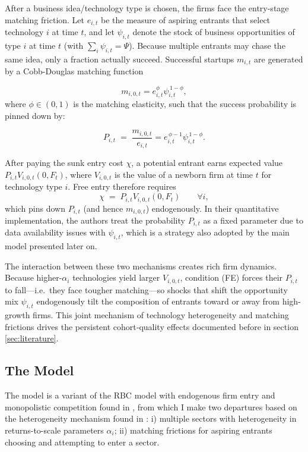 \documentclass[a4paper,12pt]{article} %
\numberwithin{equation}{section} %
\numberwithin{figure}{section}
\numberwithin{table}{section}
\begin{document}
After a business idea/technology type is chosen, the firms face the entry-stage matching friction. Let $e_{i,t}$ be
the measure of aspiring entrants that select technology $i$ at time $t$, and let $\psi_{i,t}$ denote the stock 
of business opportunities of type $i$ at time $t$ (with $\sum_i\psi_{i,t}=\Psi$). Because multiple entrants may chase the same idea, only
a fraction actually succeed. Successful startups $m_{i,t}$ are generated by a Cobb-Douglas matching function

\[
m_{i,0,t}=e_{i,t}^{\phi}\psi_{i,t}^{\,1-\phi},
\]
where $\phi\in(0,1)$ is the matching elasticity, such that the success probability is pinned down by:

\[
P_{i,t}\;=\;\frac{m_{i,0,t}}{e_{i,t}}=e_{i,t}^{\,\phi-1}\psi_{i,t}^{\,1-\phi}.
\]

After paying the sunk entry cost $\chi$, a potential entrant earns expected value
$P_{i,t}V_{i,0,t}(0,F_t)$, where $V_{i,0,t}$ is the value of a newborn firm at time $t$ for technology type $i$.
Free entry therefore requires
\[
\chi \;=\;P_{i,t}V_{i,0,t}(0,F_t)\qquad\forall i,  \tag{FE}
\]
which pins down $P_{i,t}$ (and hence $m_{i,0,t}$) endogenously. In their quantitative implementation, the authors treat the 
probability $P_{i,t}$ as a fixed parameter due to data availability issues with $\psi_{i,t}$, which is a strategy also adopted
by the main model presented later on.

The interaction between these two mechanisms creates rich firm dynamics. Because higher-$\alpha_i$ technologies yield 
larger $V_{i,0,t}$, condition (FE) forces their $P_{i,t}$ to fall—i.e.\ they face tougher matching—so shocks that 
shift the opportunity mix $\psi_{i,t}$ endogenously tilt the composition of entrants toward or away from high-growth firms. 
This joint mechanism of technology heterogeneity and matching frictions drives the persistent 
cohort‐quality effects documented before in section \ref{sec:literature}. 

\subsection{The Model}
\label{sec:model-mine}

The model is a variant of the RBC model with endogenous firm entry and monopolistic competition found in \textcite{bilbiie2012endogenous}, from which
I make two departures based on the heterogeneity mechanism found in \textcite{sedlavcek2017growth}: i) multiple sectors with heterogeneity in
returns-to-scale parameters $\alpha_i$; ii) matching frictions for aspiring entrants choosing and attempting to enter a sector.
\end{document}
